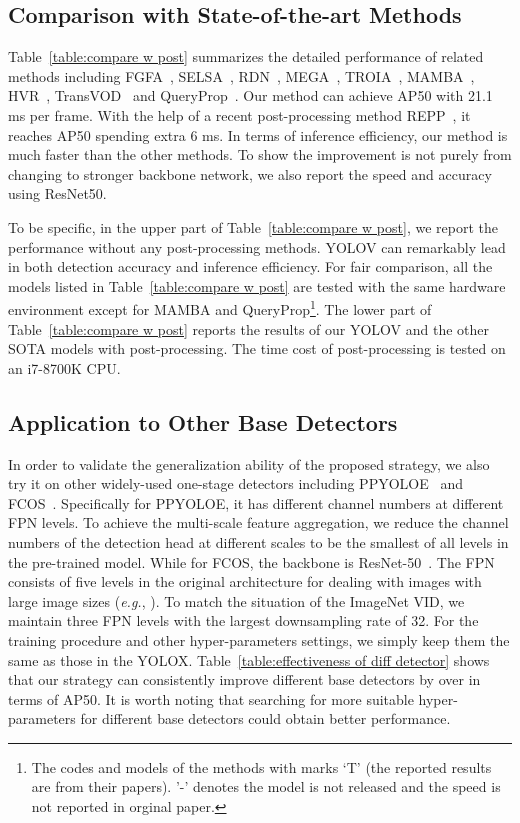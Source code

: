 \documentclass[letterpaper]{article} \usepackage{aaai23}  \usepackage{times}  \usepackage{helvet}  \usepackage{courier}  \usepackage[hyphens]{url}  \usepackage{graphicx} \urlstyle{rm} \def\UrlFont{\rm}  \usepackage{natbib}  \usepackage{caption} \usepackage{xcolor}
\begin{document}
\subsection{Comparison with State-of-the-art Methods}
Table~\ref{table:compare w post} summarizes the detailed performance of related methods including FGFA~\cite{zhu2017flow}, SELSA~\cite{wu2019sequence}, RDN~\cite{deng2019relation}, MEGA~\cite{chen2020memory}, TROIA~\cite{gong2021temporal}, MAMBA~\cite{sun2021mamba}, HVR~\cite{han2020mining}, TransVOD~\cite{he2021end} and QueryProp~\cite{he2022queryprop}. Our method can achieve  AP50 with 21.1 ms per frame. With the help of a recent post-processing method REPP~\cite{sabater2020robust}, it reaches  AP50 spending extra 6 ms. In terms of inference efficiency, our method is much faster than the other methods. To show the improvement is not purely from changing to stronger backbone network, we also report the speed and accuracy using ResNet50.

To be specific, in the upper part of Table~\ref{table:compare w post}, we report the performance without any post-processing methods. YOLOV can remarkably lead in both detection accuracy and inference efficiency. For fair comparison, all the models listed in Table~\ref{table:compare w post} are tested with the same hardware environment except for MAMBA and QueryProp\footnote{The codes and models of the methods with marks `T' (the reported results are from their papers). '-' denotes the model is not released and the speed is not reported in orginal paper.}.  The lower part of Table~\ref{table:compare w post} reports the results of our YOLOV and the other SOTA models with post-processing. The time cost of post-processing is tested on an i7-8700K CPU.

 
\subsection{Application to Other Base Detectors}
In order to validate the generalization ability of the proposed strategy, we also try it on other widely-used one-stage detectors including PPYOLOE~\cite{xu2022pp} and FCOS~\cite{tian2019fcos}. Specifically for PPYOLOE, it has different channel numbers at different FPN levels. To achieve the multi-scale feature aggregation, we reduce the channel numbers of the detection head at different scales to be the smallest of all levels in the pre-trained model. While for FCOS, the backbone is ResNet-50~\cite{he2016deep}. The FPN consists of five levels in the original architecture for dealing with images with large image sizes (\emph{e.g.}, ). To match the situation of the ImageNet VID, we maintain three FPN levels with the largest downsampling rate of 32. For the training procedure and other hyper-parameters settings, we simply keep them the same as those in the YOLOX. Table~\ref{table:effectiveness of diff detector} shows that our strategy can consistently improve different base detectors by over  in terms of AP50. It is worth noting that searching for more suitable hyper-parameters for different base detectors could obtain better performance.\\
\end{document}
